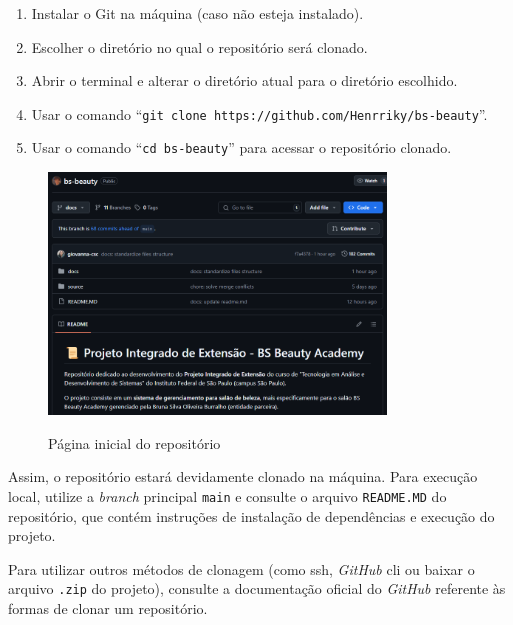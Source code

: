 \begin{enumerate}
	\item Instalar o Git na máquina (caso não esteja instalado).
	\item Escolher o diretório no qual o repositório será clonado.
	\item Abrir o terminal e alterar o diretório atual para o diretório escolhido.
	\item Usar o comando ``\texttt{git clone https://github.com/Henrriky/bs-beauty}''.
	\item Usar o comando ``\texttt{cd bs-beauty}'' para acessar o repositório clonado.
\end{enumerate}

\begin{figure}[h]
	\centering
	\caption{Página inicial do repositório}
	\includegraphics[width=0.8\textwidth]{cap03-gestao/imagens/bsbeauty-repositorio.png}
	\label{fig:inicio-repositorio}
\end{figure}

Assim, o repositório estará devidamente clonado na máquina. Para execução local, utilize a \textit{branch} principal \texttt{main} e consulte o arquivo \texttt{README.MD} do repositório, que contém instruções de instalação de dependências e execução do projeto.

Para utilizar outros métodos de clonagem (como \gls{ssh}, \emph{GitHub} \gls{cli} ou baixar o arquivo \texttt{.zip} do projeto), consulte a documentação oficial do \emph{GitHub} \cite{clone-2025} referente às formas de clonar um repositório.
